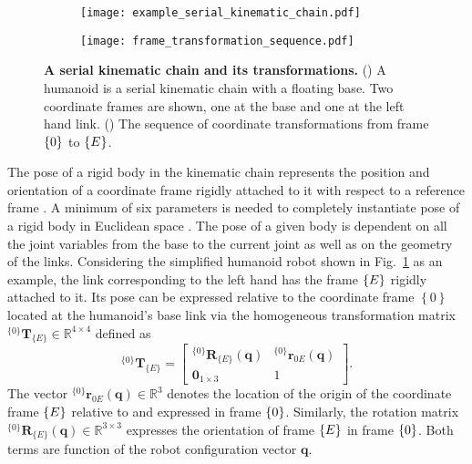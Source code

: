 \begin{figure*}[!t]
	\centering	
	\hspace*{\fill}
	\begin{subfigure}[t]{0.40\textwidth}
		\subcaption{}
		\texttt{[image: example\_serial\_kinematic\_chain.pdf]}
		\label{fig:example_serial_kinematic_chain}
	\end{subfigure}	
	\hfill
	\begin{subfigure}[t]{0.40\textwidth}
		\subcaption{}
		\texttt{[image: frame\_transformation\_sequence.pdf]}
		\label{fig:transformation_sequence}
	\end{subfigure}	
	\hspace*{\fill}
	\caption{\label{fig:serial_kinematic_chain} \textbf{A serial kinematic chain and its transformations.} ()  A humanoid is a serial kinematic chain with a floating base. Two coordinate frames are shown, one at the base and one at the left hand link. () The sequence of coordinate transformations from frame ${\left\lbrace 0 \right\rbrace}$ to ${\left\lbrace E \right\rbrace}$.}
\end{figure*}

The pose of a rigid body in the kinematic chain represents the position and orientation of a coordinate frame rigidly attached to it with respect to a reference frame \cite{Siciliano2008RoboticsModellingPlanning}. A minimum of six parameters is needed to completely instantiate pose of a rigid body in Euclidean space \cite{Lynch2017Modernrobotics}. The pose of a given body is dependent on all the joint variables from the base to the current joint as well as on the geometry of the links. Considering the simplified humanoid robot shown in Fig.~\ref{fig:example_serial_kinematic_chain} as an example, the link corresponding to the left hand has the frame ${\left\lbrace E \right\rbrace}$ rigidly attached to it. Its pose can be expressed relative to the coordinate frame $\left\lbrace 0 \right\rbrace$ located at the humanoid's base link via the homogeneous transformation matrix $^{\{0\}}\bm{T}_{\{E\}}  \in \mathbb{R}^{4\times 4}$ defined as
\begin{equation}
	^{\{0\}}\bm{T}_{\{E\}} = \begin{bmatrix}
		^{\{0\}}\bm{R}_{\{E\}}(\bm{q}) & ^{\{0\}}\bm{r}_{0E}(\bm{q}) \\
		\bm{0}_{1\times3} & 1
	\end{bmatrix}.
\end{equation}
The vector $^{\{0\}}\bm{r}_{0E}(\bm{q}) \in \mathbb{R}^3$ denotes the location of the origin of the coordinate frame ${\left\lbrace E \right\rbrace}$ relative to and expressed in frame ${\left\lbrace 0 \right\rbrace}$. Similarly, the rotation matrix $^{\{0\}}\bm{R}_{\{E\}}(\bm{q})  \in \mathbb{R}^{3\times 3}$ expresses the orientation of frame ${\left\lbrace E \right\rbrace}$ in frame ${\left\lbrace 0 \right\rbrace}$. Both terms are function of the robot configuration vector $\bm{q}$.

